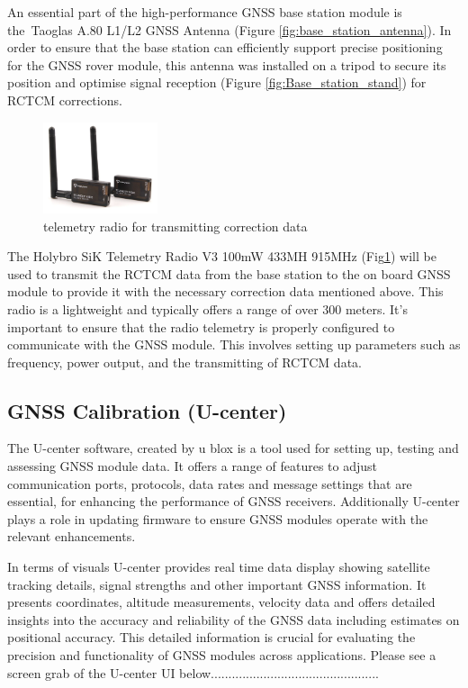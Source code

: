 \documentclass{report}
\begin{document}
An essential part of the high-performance GNSS base station module is
the Taoglas A.80 L1/L2 GNSS Antenna (Figure \ref{fig:base_station_antenna}). In
order to ensure that the base station can efficiently support precise
positioning for the GNSS rover module, this antenna was installed on a tripod to
secure its position and optimise signal reception
(Figure \ref{fig:Base_station_stand}) for RCTCM corrections. 

\begin{figure}[H]
  \centering
  \includegraphics[width=0.3\textwidth]{Pictures/telemetry radio.png}
  \caption{telemetry radio for transmitting correction data}
  \label{fig:telemetry_radio}
\end{figure}
The Holybro SiK Telemetry Radio V3 100mW 433MH 915MHz
(Fig\ref{fig:telemetry_radio}) will be used to transmit the RCTCM data from the
base station to the on board GNSS module to provide it with the necessary
correction data mentioned above. This radio is a lightweight and typically
offers a range of over 300 meters. It's important to ensure that the radio
telemetry is properly configured to communicate with the GNSS module. This
involves setting up parameters such as frequency, power output, and the
transmitting of RCTCM data.

\subsection{GNSS Calibration (U-center)}
The U-center software, created by u blox is a tool used for setting up, testing
and assessing GNSS module data. It offers a range of features to adjust
communication ports, protocols, data rates and message settings that are
essential, for enhancing the performance of GNSS receivers. Additionally
U-center plays a role in updating firmware to ensure GNSS modules operate with
the relevant enhancements.

In terms of visuals U-center provides real time data display showing satellite
tracking details, signal strengths and other important GNSS information. It
presents coordinates, altitude measurements, velocity data and offers detailed
insights into the accuracy and reliability of the GNSS data including estimates
on positional accuracy. This detailed information is crucial for evaluating the
precision and functionality of GNSS modules across applications. Please see a
screen grab of the U-center UI
below................................................
\end{document}
